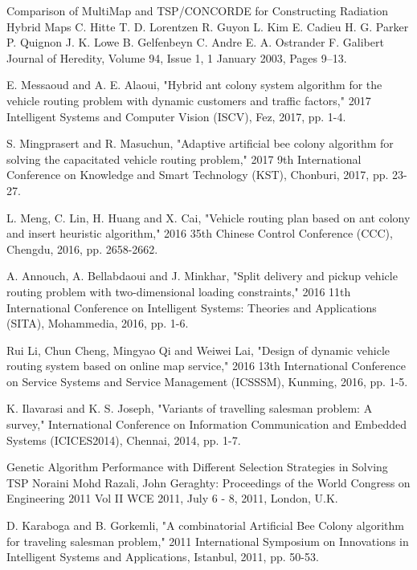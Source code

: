 \documentclass[conference]{IEEEtran}
\begin{document}
\begin{thebibliography}{00}

 Comparison of MultiMap and TSP/CONCORDE for Constructing Radiation Hybrid Maps C. Hitte T. D. Lorentzen R. Guyon L. Kim E. Cadieu H. G. Parker P. Quignon J. K. Lowe B. Gelfenbeyn C. Andre E. A. Ostrander F. Galibert Journal of Heredity, Volume 94, Issue 1, 1 January 2003, Pages 9–13.

 E. Messaoud and A. E. Alaoui, "Hybrid ant colony system algorithm for the vehicle routing problem with dynamic customers and traffic factors," 2017 Intelligent Systems and Computer Vision (ISCV), Fez, 2017, pp. 1-4.

 S. Mingprasert and R. Masuchun, "Adaptive artificial bee colony algorithm for solving the capacitated vehicle routing problem," 2017 9th International Conference on Knowledge and Smart Technology (KST), Chonburi, 2017, pp. 23-27.

 L. Meng, C. Lin, H. Huang and X. Cai, "Vehicle routing plan based on ant colony and insert heuristic algorithm," 2016 35th Chinese Control Conference (CCC), Chengdu, 2016, pp. 2658-2662.

 A. Annouch, A. Bellabdaoui and J. Minkhar, "Split delivery and pickup vehicle routing problem with two-dimensional loading constraints," 2016 11th International Conference on Intelligent Systems: Theories and Applications (SITA), Mohammedia, 2016, pp. 1-6.

 Rui Li, Chun Cheng, Mingyao Qi and Weiwei Lai, "Design of dynamic vehicle routing system based on online map service," 2016 13th International Conference on Service Systems and Service Management (ICSSSM), Kunming, 2016, pp. 1-5.

 K. Ilavarasi and K. S. Joseph, "Variants of travelling salesman problem: A survey," International Conference on Information Communication and Embedded Systems (ICICES2014), Chennai, 2014, pp. 1-7.

 Genetic Algorithm Performance with Different Selection Strategies in Solving TSP Noraini Mohd Razali, John Geraghty: Proceedings of the World Congress on Engineering 2011 Vol II WCE 2011, July 6 - 8, 2011, London, U.K.

 D. Karaboga and B. Gorkemli, "A combinatorial Artificial Bee Colony algorithm for traveling salesman problem," 2011 International Symposium on Innovations in Intelligent Systems and Applications, Istanbul, 2011, pp. 50-53.


\end{thebibliography}
\end{document}
